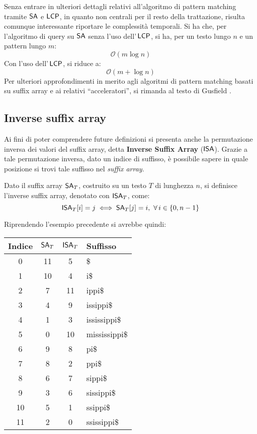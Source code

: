Senza entrare in ulteriori dettagli relativi all'algoritmo di pattern matching
tramite $\mbox{\rm {\sf SA}}$ e $\mbox{\rm {\sf LCP}}$, in quanto non centrali per il resto della
trattazione, risulta comunque interessante riportare le complessità
temporali. Si ha che, per l'algoritmo di query su $\mbox{\rm {\sf SA}}$ senza l'uso
dell'$\,\mbox{\rm {\sf LCP}}$, si ha, per un testo lungo $n$ e un pattern lungo $m$:
\begin{equation}
  \label{eq:satime}
  \mathcal{O}(m\log n)
\end{equation}
Con l'uso dell'$\,\mbox{\rm {\sf LCP}}$, si riduce a:
\begin{equation}
  \label{eq:salcptime}
  \mathcal{O}(m+\log n)
\end{equation}
Per ulteriori approfondimenti in merito agli algoritmi di pattern matching
basati su suffix array e ai relativi ``acceleratori'', si rimanda
al testo di Gusfield \cite{gusfield1997}.
\subsection{Inverse suffix array}
Ai fini di poter comprendere future definizioni si presenta anche la
permutazione inversa dei valori del suffix array, detta
\textbf{Inverse Suffix Array} ($\mbox{\rm {\sf ISA}}$). Grazie a tale permutazione
inversa, dato un indice di suffisso, è possibile sapere in quale posizione si
trovi tale suffisso nel \textit{suffix array}.  
\begin{definizione}
  Dato il suffix array $\mbox{\rm {\sf SA}}_T$, costruito su un testo $T$ di lunghezza
  $n$, si definisce l'inverse suffix array, denotato con $\mbox{\rm {\sf ISA}}_T$, come:
  \begin{equation}
    \label{eq:isadef}
    \mbox{\rm {\sf ISA}}_T[i]=j\iff \mbox{\rm {\sf SA}}_T[j]=i,\,\,\forall\, i\in\{0,n-1\}
  \end{equation}
\end{definizione}

\begin{esempio}
  Riprendendo l'esempio precedente si avrebbe quindi:
  \begin{table}[H]
    \centering
    \footnotesize
    \begin{tabular}{c|c|c|l} 
      \textbf{Indice} & $\mbox{\rm {\sf SA}}_T$ & $\mbox{\rm {\sf ISA}}_T$ & \textbf{Suffisso}\\ 
      \hline
      0 & 11 & 5 & \$\\
      1 & 10 & 4 & i\$\\
      2 & 7 & 11 & ippi\$\\
      3 & 4 & 9 & issippi\$\\
      4 & 1 & 3 & ississippi\$\\
      5 & 0 & 10 & mississippi\$\\
      6 & 9 & 8 & pi\$\\
      7 & 8 & 2 & ppi\$\\
      8 & 6 & 7 & sippi\$\\
      9 & 3 & 6 & sissippi\$\\
      10 & 5 & 1 & ssippi\$\\
      11 & 2 & 0 & ssissippi\$\\
    \end{tabular}
  \end{table}
\end{esempio}
